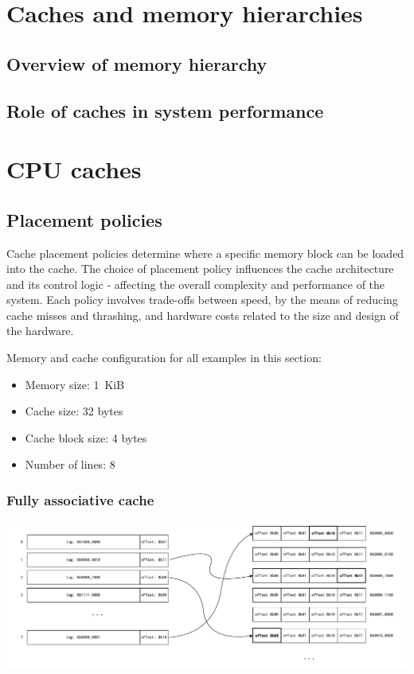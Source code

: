 %

\section{Caches and memory hierarchies}


\subsection{Overview of memory hierarchy}
\subsection{Role of caches in system performance}
%

\section{CPU caches}
%
\subsection{Placement policies}
Cache placement policies determine where a specific memory block can be loaded into
the cache. The choice of placement policy influences the cache architecture and
its control logic - affecting the overall complexity and performance of the system.
Each policy involves trade-offs between speed, by the means of reducing cache misses and
thrashing, and hardware costs related to the size and design of the hardware.

\vspace{10px}
\noindent Memory and cache configuration for all examples in this section:
\begin{itemize}
	\item Memory size: 1 KiB
	\item Cache size: 32 bytes
	\item Cache block size: 4 bytes
	\item Number of lines: 8
\end{itemize}

\subsubsection{Fully associative cache}
\begin{center}
	\centering
	\includegraphics[width=\textwidth]{figures/02-background/full_ass_mem.pdf}
	\label{fig:full_ass_mem}
\end{center}


